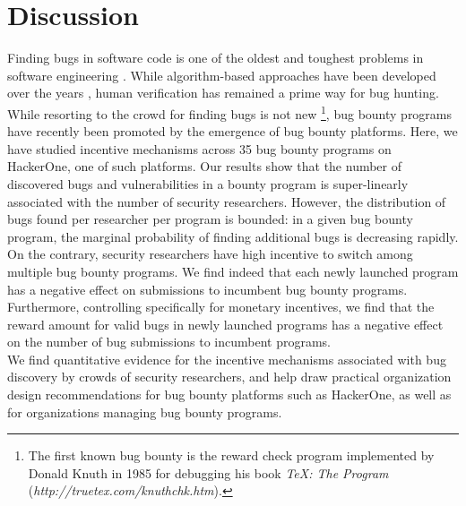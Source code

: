 \section{Discussion}
\label{sec:discussion}
Finding bugs in software code is one of the oldest and toughest problems in software engineering \cite{adams1984textordfeminineoptimizing}. While algorithm-based approaches have been developed over the years \cite{avgerinos2014enhancing}, human verification has remained a prime way for bug hunting. While resorting to the crowd for finding bugs is not new \footnote{The first known bug bounty is the reward check program implemented by Donald Knuth in 1985 for debugging his book {\it TeX: The Program} ({\it http://truetex.com/knuthchk.htm}).}, bug bounty programs have recently been promoted by the emergence of bug bounty platforms. Here, we have studied incentive mechanisms across 35 bug bounty programs on HackerOne, one of such platforms. Our results show that the number of discovered bugs and vulnerabilities in a bounty program is super-linearly associated with the number of security researchers. However, the distribution of bugs found per researcher per program is bounded: in a given bug bounty program, the marginal probability of finding additional bugs is decreasing rapidly. On the contrary, security researchers have high incentive to switch among multiple bug bounty programs. We find indeed that each newly launched program has a negative effect on submissions to incumbent bug bounty programs. Furthermore, controlling specifically for monetary incentives, we find that the reward amount for valid bugs in newly launched programs has a negative effect on the number of bug submissions to incumbent programs.  \\

We find quantitative evidence for the incentive mechanisms associated with bug discovery by crowds of security researchers, and help draw practical organization design recommendations for bug bounty platforms such as HackerOne, as well as for organizations managing bug bounty programs.\\
 
